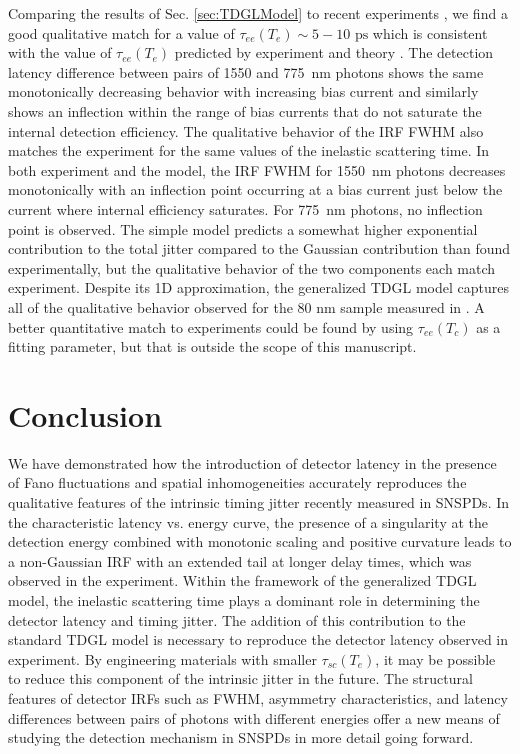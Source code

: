 \documentclass[%
reprint,
 amsmath,amssymb,
aps,
pra,
]{revtex4-1}
\begin{document}
\quad Comparing the results of Sec. \ref{sec:TDGLModel} to recent experiments \cite{korzh_demonstrating_2018}, we find a good qualitative match for a value of \(\tau_{ee}\left(T_e\right) \sim 5-10 \text{ ps}\) which is consistent with the value of \(\tau_{ee}\left(T_e\right) \) predicted by experiment \cite{ilin_ultimate_1998} and theory \cite{korneeva_comparison_2017}.  The detection latency difference between pairs of 1550 and 775~nm photons shows the same monotonically decreasing behavior with increasing bias current and similarly shows an inflection within the range of bias currents that do not saturate the internal detection efficiency.  The qualitative behavior of the IRF FWHM also matches the experiment for the same values of the inelastic scattering time.  In both experiment \cite{korzh_demonstrating_2018} and the model, the IRF FWHM for 1550~nm photons decreases monotonically with an inflection point occurring at a bias current just below the current where internal efficiency saturates.  For 775~nm photons, no inflection point is observed.  The simple model predicts a somewhat higher exponential contribution to the total jitter compared to the Gaussian contribution than found experimentally, but the qualitative behavior of the two components each match experiment.  Despite its 1D approximation, the generalized TDGL model captures all of the qualitative behavior observed for the 80 nm sample measured in \cite{korzh_demonstrating_2018}.  A better quantitative match to experiments could be found by using \(\tau_{ee}\left(T_c\right)\) as a fitting parameter, but that is outside the scope of this manuscript.

\section{\label{sec:Conclusion}Conclusion}
\quad We have demonstrated how the introduction of detector latency in the presence of Fano fluctuations and spatial inhomogeneities accurately reproduces the qualitative features of the intrinsic timing jitter recently measured in SNSPDs.  In the characteristic latency vs. energy curve, the presence of a singularity at the detection energy combined with monotonic scaling and positive curvature leads to a non-Gaussian IRF with an extended tail at longer delay times, which was observed in the experiment.  Within the framework of the generalized TDGL model, the inelastic scattering time plays a dominant role in determining the detector latency and timing jitter.  The addition of this contribution to the standard TDGL model is necessary to reproduce the detector latency observed in experiment.  By engineering materials with smaller \(\tau_{sc}\left(T_e\right)\), it may be possible to reduce this component of the intrinsic jitter in the future.  The structural features of detector IRFs such as FWHM, asymmetry characteristics, and latency differences between pairs of photons with different energies offer a new means of studying the detection mechanism in SNSPDs in more detail going forward.
\end{document}
